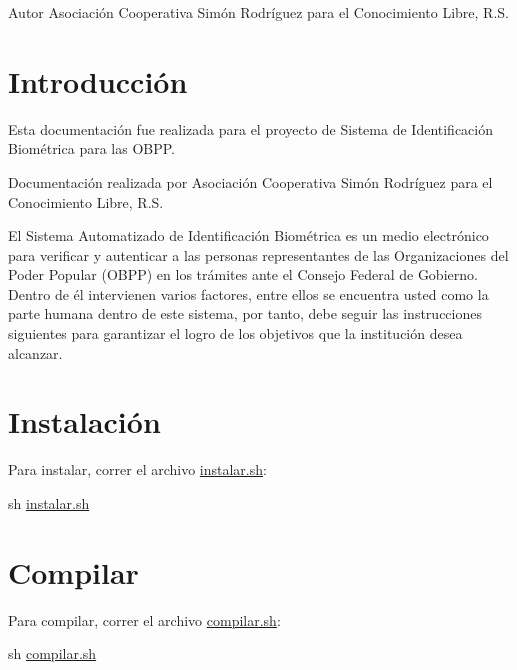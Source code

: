 \begin{DoxyAuthor}{Autor}
Asociación Cooperativa Simón Rodríguez para el Conocimiento Libre, R.\+S. 
\end{DoxyAuthor}
\hypertarget{index_intro_sec}{}\section{Introducción}\label{index_intro_sec}
Esta documentación fue realizada para el proyecto de Sistema de Identificación Biométrica para las O\+B\+PP.

Documentación realizada por Asociación Cooperativa Simón Rodríguez para el Conocimiento Libre, R.\+S.

El Sistema Automatizado de Identificación Biométrica es un medio electrónico para verificar y autenticar a las personas representantes de las Organizaciones del Poder Popular (O\+B\+PP) en los trámites ante el Consejo Federal de Gobierno. Dentro de él intervienen varios factores, entre ellos se encuentra usted como la parte humana dentro de este sistema, por tanto, debe seguir las instrucciones siguientes para garantizar el logro de los objetivos que la institución desea alcanzar.\hypertarget{index_install_sec}{}\section{Instalación}\label{index_install_sec}
Para instalar, correr el archivo \hyperlink{instalar_8sh}{instalar.\+sh}\+:

sh \hyperlink{instalar_8sh}{instalar.\+sh}\hypertarget{index_compile_sec}{}\section{Compilar}\label{index_compile_sec}
Para compilar, correr el archivo \hyperlink{compilar_8sh}{compilar.\+sh}\+:

sh \hyperlink{compilar_8sh}{compilar.\+sh} 